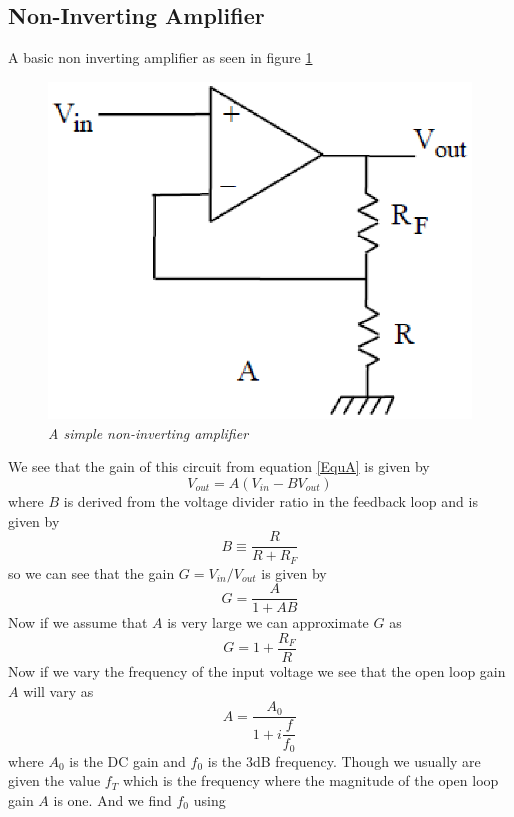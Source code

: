 \documentclass[11pt]{article}
\numberwithin{equation}{section}
\numberwithin{figure}{section}
\numberwithin{table}{section}
\begin{document}
\subsection{Non-Inverting Amplifier}
A basic non inverting amplifier as seen in figure \ref{FigNonInvAmp}
\begin{figure}[h]
\centering
\includegraphics[scale=0.60]{FigNonInvAmp.eps}
\caption{\textit{A simple non-inverting amplifier}}
\label{FigNonInvAmp}
\end{figure}
We see that the gain of this circuit from equation \ref{EquA} is given by
$$V_{out} = A(V_{in}-BV_{out})$$
where $B$ is derived from the voltage divider ratio in the feedback loop and is given by
\begin{equation}
B\equiv\frac{R}{R+R_F}
\label{BVoltDiv}
\end{equation}
so we can see that the gain $G=V_{in}/V_{out}$ is given by 
\begin{equation}
G = \frac{A}{1+AB}
\label{NonInvGain}
\end{equation}
Now if we assume that $A$ is very large we can approximate $G$ as
$$G = 1+\frac{R_F}{R}$$
Now if we vary the frequency of the input voltage we see that the open loop gain $A$ will vary as
\begin{equation}
A = \frac{A_0}{1+i\dfrac{f}{f_0}}
\label{AFreq}
\end{equation}
where $A_0$ is the DC gain and $f_0$ is the $3$dB frequency. Though we usually are given the value $f_T$ which is the frequency where the magnitude of the open loop gain $A$ is one. And we find $f_0$ using
\end{document}
